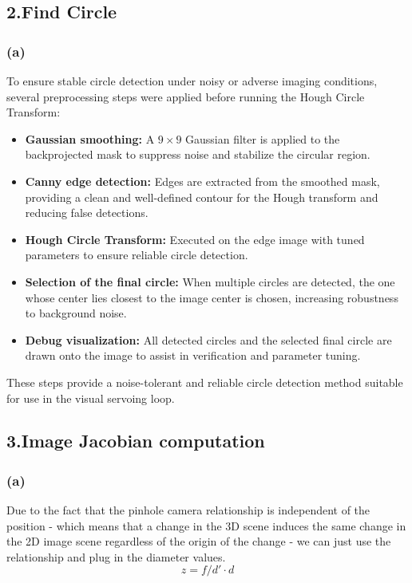 \documentclass[a4paper,12pt]{article}
\begin{document}
\subsection*{2.Find Circle}
\subsubsection*{(a)}
To ensure stable circle detection under noisy or adverse imaging conditions, 
several preprocessing steps were applied before running the Hough Circle Transform:

\begin{itemize}
    \item \textbf{Gaussian smoothing:}  
    A \(9 \times 9\) Gaussian filter is applied to the backprojected mask 
    to suppress noise and stabilize the circular region.

    \item \textbf{Canny edge detection:}  
    Edges are extracted from the smoothed mask, providing a clean and 
    well-defined contour for the Hough transform and reducing false detections.

    \item \textbf{Hough Circle Transform:}  
    Executed on the edge image with tuned parameters to ensure reliable circle detection.

    \item \textbf{Selection of the final circle:}  
    When multiple circles are detected, the one whose center lies closest 
    to the image center is chosen, increasing robustness to background noise.

    \item \textbf{Debug visualization:}  
    All detected circles and the selected final circle are drawn onto the image 
    to assist in verification and parameter tuning.
\end{itemize}

These steps provide a noise-tolerant and reliable circle detection method suitable 
for use in the visual servoing loop.


\subsection*{3.Image Jacobian computation}
\subsubsection*{(a)}
Due to the fact that the pinhole camera relationship is independent of the position - which means that a change in the 3D scene induces the same change in the 2D image scene regardless of the origin of the change - we can just use the relationship and plug in the diameter values.
\[
z = f/d' \cdot d
\]
\end{document}
